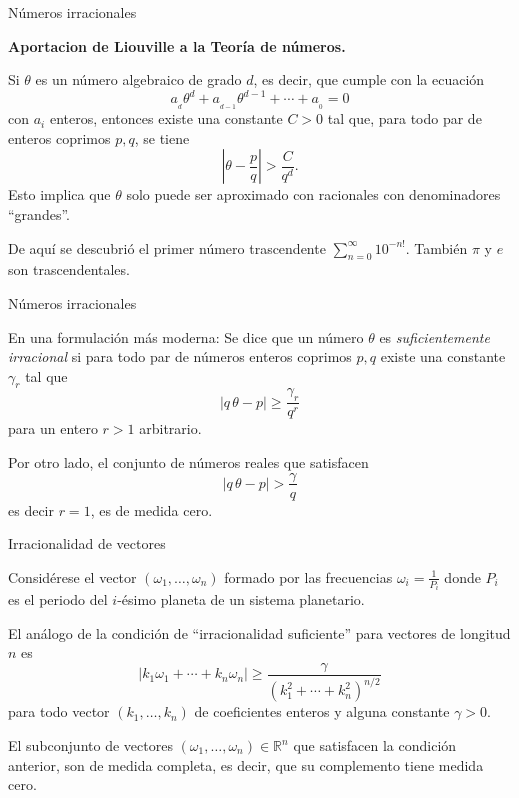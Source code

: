 \documentclass[8pt]{beamer}
\renewcommand{\>}{\rangle}
\newcommand{\<}{\langle}
\newcommand{\be}{\begin{equation}}
\newcommand{\ee}{\end{equation}}
\begin{document}
\begin{frame}{Números irracionales}
\vspace{-0.5cm}

{\bf Aportacion de Liouville a la Teoría de números.}
\vspace{1cm}

Si $\theta$ es un número algebraico de grado $d$, es decir, que cumple con la ecuación
\be 
	a_{{}_{d}}\theta^{d} + a_{{}_{d-1}}\theta^{d-1}+\cdots + a_{{}_{0}} = 0
	 \nonumber
\ee
con $a_{i}$ enteros, entonces existe una constante $C > 0$ tal que, para todo par de enteros coprimos $p, q$, se tiene
\be 
	\left| \theta - \frac{p}{q} \right| > \frac{C}{q^{d}}.
	\nonumber
\ee
Esto implica que $\theta$ solo puede ser aproximado con racionales con denominadores ``grandes''.\medskip

De aquí se descubrió el primer número trascendente $\sum_{n=0}^{\infty}10^{-n!}$. También $\pi$ y $e$ son trascendentales.

\end{frame}

\begin{frame}{Números irracionales}
\vspace{-0.5cm}

\begin{mygreenbox}{En una formulación más moderna:}
Se dice que un número $\theta$ es {\it suficientemente irracional} si para todo par de números enteros coprimos $p, q$ existe una constante $\gamma_{r}$ tal que
\be 
	\left| q\,\theta - p \right| \geq \frac{\gamma_{r}}{q^{r}} \nonumber
\ee
para un entero $r>1$ arbitrario.
\end{mygreenbox}

Por otro lado, el conjunto de números reales que satisfacen 
\be 
	\left| q\,\theta - p \right| > \frac{\gamma}{q} \nonumber
\ee
es decir $r=1$, es de medida cero. 

\end{frame}

\begin{frame}{Irracionalidad de vectores}
\vspace{-1cm}

Considérese el vector $\left(\omega_{1}, \ldots , \omega_{n} \right)$ formado por las frecuencias $\omega_{i}=\frac{1}{P_{i}}$ donde $P_{i}$ es el periodo del $i$-ésimo planeta de un sistema planetario.
\bigskip

El análogo de la condición de ``irracionalidad suficiente''  para vectores de longitud $n$ es 
\be 
	\left|k_{1}\omega_{1} + \cdots + k_{n}\omega_{n} \right|
	\geq \frac{\gamma}{(k_{1}^{2} + \cdots + k_{n}^{2})^{n/2}}
	\nonumber
\ee
para todo vector $(k_{1}, \ldots ,k_{n})$ de coeficientes enteros y alguna constante $\gamma > 0$.
\medskip

El subconjunto de vectores $(\omega_{1}, \ldots , \omega_{n}) \in \mathbb{R}^{n}$ que satisfacen la condición anterior, son de medida completa, es decir, que su complemento tiene medida cero.


\end{frame}
\end{document}
